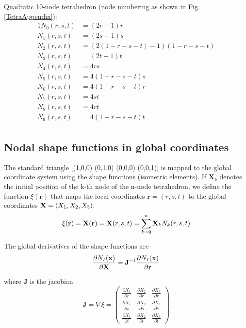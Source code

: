 Quadratic 10-node tetrahedron (node numbering as shown in Fig. \ref{TetraAppendix}):
\begin{alignat}{1}
N_0(r,s,t) &= (2r-1)r\\ 
N_1(r,s,t) &= (2s-1)s\\
N_2(r,s,t) &= (2 (1-r-s-t) -1)(1-r-s-t)\\
N_3(r,s,t) &= (2t-1)t\\
N_4(r,s,t) &= 4rs\\
N_5(r,s,t) &= 4(1-r-s-t)s\\
N_6(r,s,t) &= 4(1-r-s-t)r\\
N_7(r,s,t) &= 4st\\
N_8(r,s,t) &= 4rt\\
N_9(r,s,t) &= 4(1-r-s-t)t\\
\end{alignat}

\subsection{Nodal shape functions in global coordinates}

The standard triangle [(1,0,0) (0,1,0) (0,0,0) (0,0,1)] is mapped to the global coordinate system using the shape functions (isometric elements). If $\mathbf X_k$ denotes the initial position of the k-th node of the n-node tetrahedron, we define the function $\xi(\mathbf r)$ that maps the local coordinates $\mathbf r = (r,s,t)$ to the global coordinates $\mathbf {X}  = (X_1, X_2,X_3)$:
\begin{equation}
\xi (\mathbf {r}) = \mathbf {X}  (\mathbf{ r}) = \mathbf {X}  (r,s,t) = \sum_{k=0} ^n \mathbf {X}  _k N_k(r,s,t)
\end{equation}

The global derivatives of the shape functions are
\begin{equation}
\frac{\partial N_I(\mathbf {x} )}{\partial \mathbf {X} } = \mathbf J^{-1} \frac{\partial N_I(\mathbf {x} )}{\partial \mathbf r}
\end{equation}

where $\mathbf J$ is the jacobian
\begin{equation}
\mathbf J = \nabla \xi = \left(
\begin{array}{ccc}
\frac{\partial X_1}{\partial r} & \frac{\partial X_2}{\partial r} & \frac{\partial X_3}{\partial r}\\
\frac{\partial X_1}{\partial s} & \frac{\partial X_2}{\partial s} & \frac{\partial X_3}{\partial s}\\
\frac{\partial X_1}{\partial t} & \frac{\partial X_2}{\partial t} & \frac{\partial X_3}{\partial t}
\end{array}
\right)
\end{equation}





